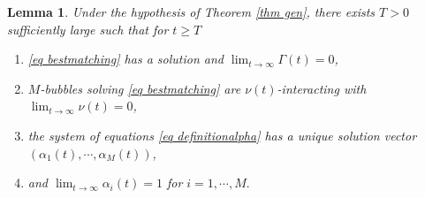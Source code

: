 \documentclass[11pt,letterpaper,reqno]{amsart}
\theoremstyle{plain}%
\newtheorem{lemma}[theorem]{Lemma}
\theoremstyle{definition}
\numberwithin{equation}{section}
\numberwithin{figure}{section}
\begin{document}
\begin{lemma}\label{lemma exbm}	
  Under the hypothesis of Theorem \ref{thm gen}, there exists $T>0$ sufficiently large such that for $t\geq T$
  \begin{enumerate}
      \item \eqref{eq bestmatching} has a solution and $\lim_{t\to \infty} \Gamma(t)=0$,
      \item $M$-bubbles solving \eqref{eq bestmatching} are $\nu(t)$-interacting with $\lim_{t\to \infty}\nu(t)=0$,
      \item the system of equations \eqref{eq definitionalpha} has a unique solution vector $(\alpha_1(t), \cdots, \alpha_M(t))$,
      \item and $\lim_{t \to \infty} \alpha_i(t)=1$ for $i=1,\cdots, M.$
  \end{enumerate}
\end{lemma}
\end{document}
